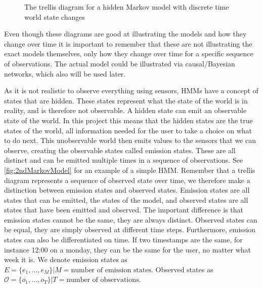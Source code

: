 \begin{figure}[htbp]
\centering
{}
\caption[Trellis diagram for a simple Markov model]{The trellis diagram for a hidden Markov model with discrete time world state changes}\label{fig:1stMarkovModel}
\end{figure}

Even though these diagrams are good at illustrating the models and how they change over time it is important to remember that these are not illustrating the exact models themselves, only how they change over time for a specific sequence of observations. The actual model could be illustrated via causal/Bayesian networks, which also will be used later.


As it is not realistic to observe everything using sensors, HMMs have a concept of states that are hidden. These states represent what the state of the world is in reality, and is therefore not observable. A hidden state can emit an observable state of the world. In this project this means that the hidden states are the true states of the world, all information needed for the user to take a choice on what to do next. This unobservable world then emits values to the sensors that we can observe, creating the observable states called emission states. These are all distinct and can be emitted multiple times in a sequence of observations. See \cref{fig:2ndMarkovModel} for an example of a simple HMM. Remember that a trellis diagram represents a sequence of observed state over time, we therefore make a distinction between emission states and observed states. Emission states are all states that can be emitted, the states of the model, and observed states are all states that have been emitted and observed. The important difference is that emission states cannot be the same, they are always distinct. Observed states can be equal, they are simply observed at different time steps. Furthermore, emission states can also be differentiated on time. If two timestamps are the same, for instance 12:00 on a monday, they can be the same for the user, no matter what week it is. We denote emission states as $E=\{e_1, \dots ,e_{M}\}|M = \text{number of emission states}$. Observed states as $\mathcal{O}=\{o_1, \dots , o_T\}|T = \text{number of observations}$.

